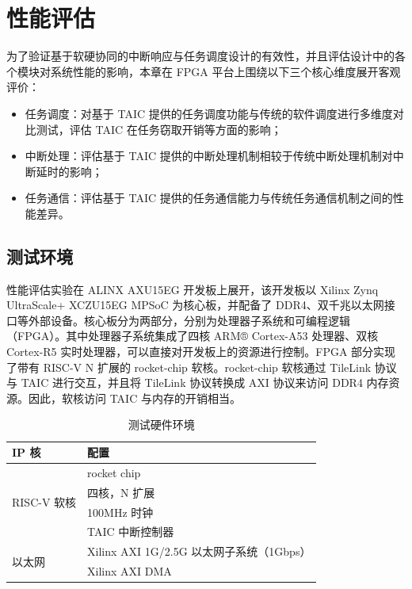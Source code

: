 \chapter{性能评估}

为了验证基于软硬协同的中断响应与任务调度设计的有效性，并且评估设计中的各个模块对系统性能的影响，本章在 FPGA 平台上围绕以下三个核心维度展开客观评价：

\begin{itemize}
    \item 任务调度：对基于 TAIC 提供的任务调度功能与传统的软件调度进行多维度对比测试，评估 TAIC 在任务窃取开销等方面的影响；
    
    \item 中断处理：评估基于 TAIC 提供的中断处理机制相较于传统中断处理机制对中断延时的影响；
    
    \item 任务通信：评估基于 TAIC 提供的任务通信能力与传统任务通信机制之间的性能差异。
\end{itemize}

\section{测试环境}

性能评估实验在 ALINX AXU15EG 开发板上展开，该开发板以 Xilinx Zynq UltraScale+ XCZU15EG MPSoC 为核心板，并配备了 DDR4、双千兆以太网接口等外部设备。核心板分为两部分，分别为处理器子系统和可编程逻辑（FPGA）。其中处理器子系统集成了四核 ARM® Cortex-A53 处理器、双核 Cortex-R5 实时处理器，可以直接对开发板上的资源进行控制。FPGA 部分实现了带有 RISC-V N 扩展的 rocket-chip 软核。rocket-chip 软核通过 TileLink 协议与 TAIC 进行交互，并且将 TileLink 协议转换成 AXI 协议来访问 DDR4 内存资源。因此，软核访问 TAIC 与内存的开销相当。

\begin{table}[htbp]
    \centering
    \caption{测试硬件环境}
    \label{tab:platform}
    \begin{tabular}{ll}
        \toprule
        \textbf{IP 核} & \textbf{配置} \\
        \midrule
        \multirow{4}{*}{RISC-V 软核} & rocket chip \\
        & 四核，N 扩展 \\
        & 100MHz 时钟 \\
        & TAIC 中断控制器 \\
        \multirow{2}{*}{以太网} & Xilinx AXI 1G/2.5G 以太网子系统（1Gbps） \\
        & Xilinx AXI DMA \\
        \bottomrule
    \end{tabular}
\end{table}


